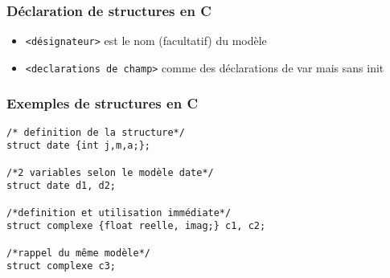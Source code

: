 \documentclass[table,handout,tikz,12pt,svgnames]{beamer}
\begin{document}
\begin{frame}[fragile=singleslide]
	\frametitle{Déclaration de structures en C}
	\begin{itemize}
		où:
		\item \texttt{<désignateur>} est le nom (facultatif) du modèle
		\item \texttt{<declarations de champ>} comme des déclarations de var mais sans init
	\end{itemize}
\end{frame}


\begin{frame}[fragile=singleslide]
	\frametitle{Exemples de structures en C}
	\begin{verbatim} 
/* definition de la structure*/
struct date {int j,m,a;}; 

/*2 variables selon le modèle date*/
struct date d1, d2;

/*definition et utilisation immédiate*/
struct complexe {float reelle, imag;} c1, c2;

/*rappel du même modèle*/
struct complexe c3;
	\end{verbatim}
\end{frame}

\end{document}
